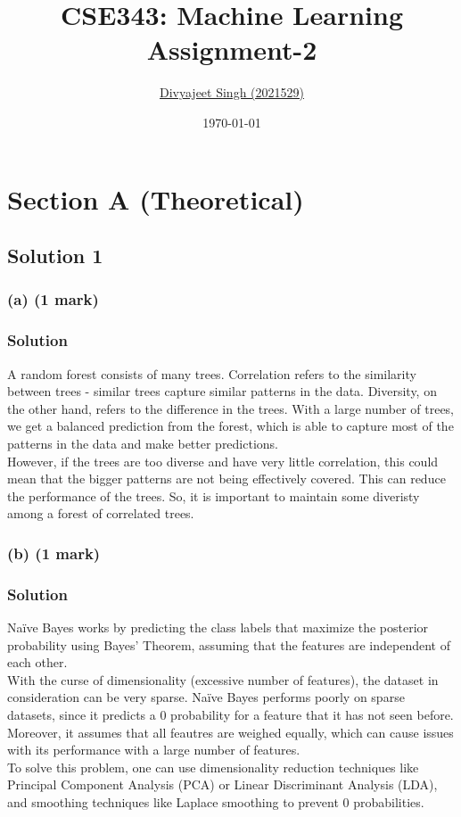 \documentclass[12pt]{article}
\title{
    \textbf{CSE343: Machine Learning} \\ \vspace*{-5pt}
    \textbf{\large{Assignment-2}}
}
\author{\href{mailto:divyajeet21529@iiitd.ac.in}{Divyajeet Singh (2021529)}}
\date{\today}
\begin{document}
    \maketitle

    \section{Section A (Theoretical)}
    \subsection*{Solution 1}

    \subsubsection*{(a) (1 mark)}
    \subsubsection*{Solution}
    A random forest consists of many trees. Correlation refers to the similarity
    between trees - similar trees capture similar patterns in the data. Diversity,
    on the other hand, refers to the difference in the trees. With a large number of
    trees, we get a balanced prediction from the forest, which is able to capture
    most of the patterns in the data and make better predictions. \\
    However, if the trees are too diverse and have very little correlation,
    this could mean that the bigger patterns are not being effectively covered. This
    can reduce the performance of the trees. So, it is important to maintain some
    diveristy among a forest of correlated trees.

    \subsubsection*{(b) (1 mark)}
    \subsubsection*{Solution}
    Naïve Bayes works by predicting the class labels that maximize the posterior
    probability using Bayes' Theorem, assuming that the features are independent of
    each other. \\
    With the curse of dimensionality (excessive number of features), the dataset in
    consideration can be very sparse. Naïve Bayes performs poorly on sparse datasets,
    since it predicts a 0 probability for a feature that it has not seen before.
    Moreover, it assumes that all feautres are weighed equally, which can cause
    issues with its performance with a large number of features. \\
    To solve this problem, one can use dimensionality reduction techniques like
    Principal Component Analysis (PCA) or Linear Discriminant Analysis (LDA),
    and smoothing techniques like Laplace smoothing to prevent 0 probabilities.
\end{document}
